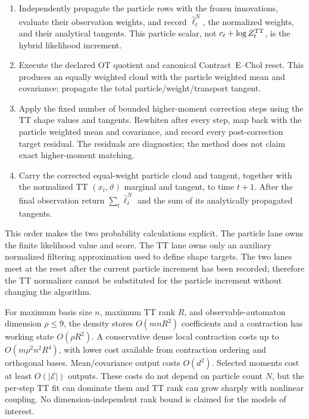 \begin{enumerate}[label=(\arabic*)]
       obtain the whitening coefficients and their tangents.  Contract
       diagonal skew/kurtosis and only the declared ordered co-skew and
       symmetric co-kurtosis entries, including the defensive numerator,
       normalizer, and quotient tangents.
 \item Independently propagate the particle rows with the frozen innovations,
       evaluate their observation weights, and record
       \(\widehat\ell_t^N\), the normalized weights, and their analytical
       tangents.  This particle scalar, not \(c_t+\log Z_t^{\rm TT}\), is the
       hybrid likelihood increment.
 \item Execute the declared OT quotient and canonical Contract~E--Chol reset.
       This produces an equally weighted cloud with the particle weighted mean
       and covariance; propagate the total particle/weight/transport tangent.
 \item Apply the fixed number of bounded higher-moment correction steps using
       the TT shape values and tangents.  Rewhiten after every step, map back
       with the particle weighted mean and covariance, and record every
       post-correction target residual.  The residuals are diagnostics; the
       method does not claim exact higher-moment matching.
 \item Carry the corrected equal-weight particle cloud and tangent, together
       with the normalized TT \((x_t,\vartheta)\) marginal and tangent, to
       time \(t+1\).  After the final observation return
       \(\sum_t\widehat\ell_t^N\) and the sum of its analytically propagated
       tangents.
\end{enumerate}

This order makes the two probability calculations explicit.  The particle
lane owns the finite likelihood value and score.  The TT lane owns only an
auxiliary normalized filtering approximation used to define shape targets.
The two lanes meet at the reset after the current particle increment has been
recorded; therefore the TT normalizer cannot be substituted for the particle
increment without changing the algorithm.

For maximum basis size \(n\), maximum TT rank \(R\), and observable-automaton
dimension \(\rho\leq9\), the density stores \(O(mnR^2)\) coefficients and a
contraction has working state \(O(\rho R^2)\).  A conservative dense local
contraction costs up to \(O(m\rho^2n^2R^4)\), with lower cost available from
contraction ordering and orthogonal bases.  Mean/covariance output costs
\(O(d^2)\).  Selected moments cost at least \(O(|\mathcal E|)\) outputs.  These
costs do not depend on particle count \(N\), but the per-step TT fit can
dominate them and TT rank can grow sharply with nonlinear coupling.  No
dimension-independent rank bound is claimed for the models of interest.

